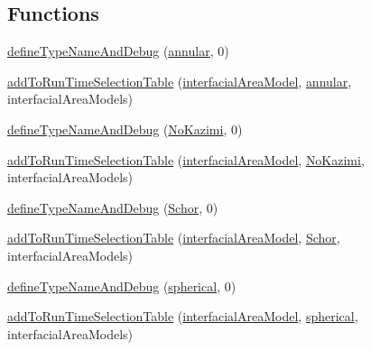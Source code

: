 \subsection*{Functions}
\begin{DoxyCompactItemize}
\item 
\hyperlink{namespaceFoam_1_1interfacialAreaModels_af27f9ae0ea5cd0a1a17105ae096882d2}{define\+Type\+Name\+And\+Debug} (\hyperlink{classFoam_1_1interfacialAreaModels_1_1annular}{annular}, 0)
\item 
\hyperlink{namespaceFoam_1_1interfacialAreaModels_aeb12f4b439c78273fa36585d91146605}{add\+To\+Run\+Time\+Selection\+Table} (\hyperlink{classFoam_1_1interfacialAreaModel}{interfacial\+Area\+Model}, \hyperlink{classFoam_1_1interfacialAreaModels_1_1annular}{annular}, interfacial\+Area\+Models)
\item 
\hyperlink{namespaceFoam_1_1interfacialAreaModels_ab82eaed59f72b7e778bd18efb799805d}{define\+Type\+Name\+And\+Debug} (\hyperlink{classFoam_1_1interfacialAreaModels_1_1NoKazimi}{No\+Kazimi}, 0)
\item 
\hyperlink{namespaceFoam_1_1interfacialAreaModels_a73a9b1eedeaefe0985ce687fd1479f0f}{add\+To\+Run\+Time\+Selection\+Table} (\hyperlink{classFoam_1_1interfacialAreaModel}{interfacial\+Area\+Model}, \hyperlink{classFoam_1_1interfacialAreaModels_1_1NoKazimi}{No\+Kazimi}, interfacial\+Area\+Models)
\item 
\hyperlink{namespaceFoam_1_1interfacialAreaModels_abed1c2b973bd65f92ef0a0ad12f769e5}{define\+Type\+Name\+And\+Debug} (\hyperlink{classFoam_1_1interfacialAreaModels_1_1Schor}{Schor}, 0)
\item 
\hyperlink{namespaceFoam_1_1interfacialAreaModels_ac10296e55d7dc517a9f31ba26a8fceb3}{add\+To\+Run\+Time\+Selection\+Table} (\hyperlink{classFoam_1_1interfacialAreaModel}{interfacial\+Area\+Model}, \hyperlink{classFoam_1_1interfacialAreaModels_1_1Schor}{Schor}, interfacial\+Area\+Models)
\item 
\hyperlink{namespaceFoam_1_1interfacialAreaModels_a27992bf6cdbfc48f19f8fb4db8566ab9}{define\+Type\+Name\+And\+Debug} (\hyperlink{classFoam_1_1interfacialAreaModels_1_1spherical}{spherical}, 0)
\item 
\hyperlink{namespaceFoam_1_1interfacialAreaModels_a4b040c01f613eea39fc86f34abafbf05}{add\+To\+Run\+Time\+Selection\+Table} (\hyperlink{classFoam_1_1interfacialAreaModel}{interfacial\+Area\+Model}, \hyperlink{classFoam_1_1interfacialAreaModels_1_1spherical}{spherical}, interfacial\+Area\+Models)
\end{DoxyCompactItemize}


